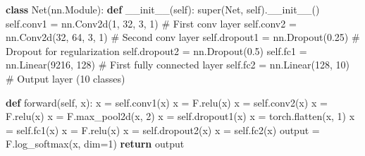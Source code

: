 \documentclass[
]{article}
\newenvironment{Shaded}{\begin{snugshade}}{\end{snugshade}}
\newcommand{\BuiltInTok}[1]{\textcolor[rgb]{0.00,0.23,0.31}{#1}}
\newcommand{\CommentTok}[1]{\textcolor[rgb]{0.37,0.37,0.37}{#1}}
\newcommand{\ControlFlowTok}[1]{\textcolor[rgb]{0.00,0.23,0.31}{\textbf{#1}}}
\newcommand{\DecValTok}[1]{\textcolor[rgb]{0.68,0.00,0.00}{#1}}
\newcommand{\FloatTok}[1]{\textcolor[rgb]{0.68,0.00,0.00}{#1}}
\newcommand{\FunctionTok}[1]{\textcolor[rgb]{0.28,0.35,0.67}{#1}}
\newcommand{\KeywordTok}[1]{\textcolor[rgb]{0.00,0.23,0.31}{\textbf{#1}}}
\newcommand{\NormalTok}[1]{\textcolor[rgb]{0.00,0.23,0.31}{#1}}
\newcommand{\OperatorTok}[1]{\textcolor[rgb]{0.37,0.37,0.37}{#1}}
\newcommand{\VariableTok}[1]{\textcolor[rgb]{0.07,0.07,0.07}{#1}}
\begin{document}
\begin{Shaded}
\begin{Highlighting}[]
\KeywordTok{class}\NormalTok{ Net(nn.Module):}
    \KeywordTok{def} \FunctionTok{\_\_init\_\_}\NormalTok{(}\VariableTok{self}\NormalTok{):}
        \BuiltInTok{super}\NormalTok{(Net, }\VariableTok{self}\NormalTok{).}\FunctionTok{\_\_init\_\_}\NormalTok{()}
        \VariableTok{self}\NormalTok{.conv1 }\OperatorTok{=}\NormalTok{ nn.Conv2d(}\DecValTok{1}\NormalTok{, }\DecValTok{32}\NormalTok{, }\DecValTok{3}\NormalTok{, }\DecValTok{1}\NormalTok{)  }\CommentTok{\# First conv layer}
        \VariableTok{self}\NormalTok{.conv2 }\OperatorTok{=}\NormalTok{ nn.Conv2d(}\DecValTok{32}\NormalTok{, }\DecValTok{64}\NormalTok{, }\DecValTok{3}\NormalTok{, }\DecValTok{1}\NormalTok{)  }\CommentTok{\# Second conv layer}
        \VariableTok{self}\NormalTok{.dropout1 }\OperatorTok{=}\NormalTok{ nn.Dropout(}\FloatTok{0.25}\NormalTok{)  }\CommentTok{\# Dropout for regularization}
        \VariableTok{self}\NormalTok{.dropout2 }\OperatorTok{=}\NormalTok{ nn.Dropout(}\FloatTok{0.5}\NormalTok{)}
        \VariableTok{self}\NormalTok{.fc1 }\OperatorTok{=}\NormalTok{ nn.Linear(}\DecValTok{9216}\NormalTok{, }\DecValTok{128}\NormalTok{)  }\CommentTok{\# First fully connected layer}
        \VariableTok{self}\NormalTok{.fc2 }\OperatorTok{=}\NormalTok{ nn.Linear(}\DecValTok{128}\NormalTok{, }\DecValTok{10}\NormalTok{)  }\CommentTok{\# Output layer (10 classes)}

    \KeywordTok{def}\NormalTok{ forward(}\VariableTok{self}\NormalTok{, x):}
\NormalTok{        x }\OperatorTok{=} \VariableTok{self}\NormalTok{.conv1(x)}
\NormalTok{        x }\OperatorTok{=}\NormalTok{ F.relu(x)}
\NormalTok{        x }\OperatorTok{=} \VariableTok{self}\NormalTok{.conv2(x)}
\NormalTok{        x }\OperatorTok{=}\NormalTok{ F.relu(x)}
\NormalTok{        x }\OperatorTok{=}\NormalTok{ F.max\_pool2d(x, }\DecValTok{2}\NormalTok{)}
\NormalTok{        x }\OperatorTok{=} \VariableTok{self}\NormalTok{.dropout1(x)}
\NormalTok{        x }\OperatorTok{=}\NormalTok{ torch.flatten(x, }\DecValTok{1}\NormalTok{)}
\NormalTok{        x }\OperatorTok{=} \VariableTok{self}\NormalTok{.fc1(x)}
\NormalTok{        x }\OperatorTok{=}\NormalTok{ F.relu(x)}
\NormalTok{        x }\OperatorTok{=} \VariableTok{self}\NormalTok{.dropout2(x)}
\NormalTok{        x }\OperatorTok{=} \VariableTok{self}\NormalTok{.fc2(x)}
\NormalTok{        output }\OperatorTok{=}\NormalTok{ F.log\_softmax(x, dim}\OperatorTok{=}\DecValTok{1}\NormalTok{)}
        \ControlFlowTok{return}\NormalTok{ output}
\end{Highlighting}
\end{Shaded}
\end{document}
